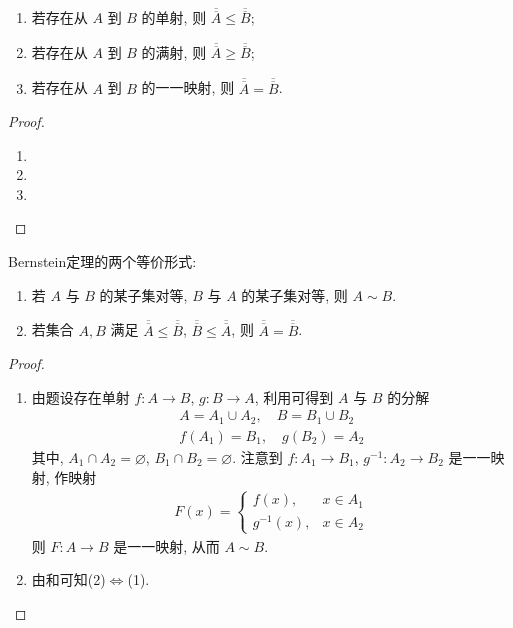 \documentclass[../../main.tex]{subfiles}
\begin{document}
\begin{proposition}[映射与基数之间的关系]\label{proposition:映射与基数之间的关系}
\begin{enumerate}[(1)]
\item 若存在从 $A$ 到 $B$ 的单射, 则 $\overline{\overline{A}} \leqslant \overline{\overline{B}}$;
\item 若存在从 $A$ 到 $B$ 的满射, 则 $\overline{\overline{A}} \geqslant \overline{\overline{B}}$;
\item 若存在从 $A$ 到 $B$ 的一一映射, 则 $\overline{\overline{A}} = \overline{\overline{B}}$.
\end{enumerate}
\end{proposition}
\begin{proof}
\begin{enumerate}[(1)]
\item 

\item 

\item 
\end{enumerate}

\end{proof}

\begin{theorem}[Bernstein定理]\label{theorem:Bernstein定理}
Bernstein定理的两个等价形式:
\begin{enumerate}[(1)]
\item 若 $A$ 与 $B$ 的某子集对等, $B$ 与 $A$ 的某子集对等, 则 $A \sim B$.

\item 若集合 $A, B$ 满足 $\overline{\overline{A}} \leqslant \overline{\overline{B}}$, $\overline{\overline{B}} \leqslant \overline{\overline{A}}$, 则 $\overline{\overline{A}} = \overline{\overline{B}}$. 
\end{enumerate}
\end{theorem}
\begin{proof}
\begin{enumerate}[(1)]
\item 由题设存在单射 $f : A \to B$, $g : B \to A$, 利用可得到 $A$ 与 $B$ 的分解
\begin{align*}
A = A_1 \cup A_2, \quad B = B_1 \cup B_2\\
f(A_1) = B_1, \quad g(B_2) = A_2
\end{align*}
其中, $A_1 \cap A_2 = \varnothing$, $B_1 \cap B_2 = \varnothing$. 注意到 $f : A_1 \to B_1$, $g^{-1} : A_2 \to B_2$ 是一一映射, 作映射
\begin{align*}
F(x) = 
\begin{cases}
f(x), & x \in A_1\\
g^{-1}(x), & x \in A_2
\end{cases}
\end{align*}
则 $F : A \to B$ 是一一映射, 从而 $A \sim B$.

\item 由和可知(2)$\Leftrightarrow$(1).
\end{enumerate}

\end{proof}
\end{document}
